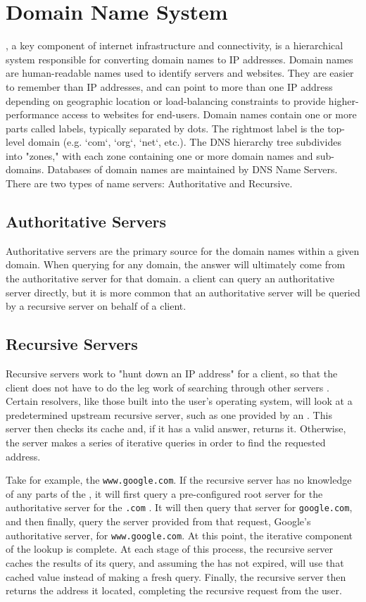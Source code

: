 \section{Domain Name System}\label{sec:background_dns}
\dns, a key component of internet infrastructure and connectivity, is a hierarchical system responsible for converting domain names to IP addresses. Domain names are human-readable names used to identify servers and websites. They are easier to remember than IP addresses, and can point to more than one IP address depending on geographic location or load-balancing constraints to provide higher-performance access to websites for end-users. Domain names contain one or more parts called labels, typically separated by dots. The rightmost label is the top-level domain (e.g. `com`, `org`, `net`, etc.). The DNS hierarchy tree subdivides into "zones," with each zone containing one or more domain names and sub-domains. Databases of domain names are maintained by DNS Name Servers. There are two types of name servers: Authoritative and Recursive.

\subsection{Authoritative Servers}
Authoritative servers are the primary source for the domain names within a given domain. When querying for any domain, the answer will ultimately come from the authoritative server for that domain. a \dns client can query an authoritative server directly, but it is more common that an authoritative server will be queried by a recursive server on behalf of a \dns client.

\subsection{Recursive Servers}
Recursive \dns servers work to "hunt down an IP address" for a client, so that the client does not have to do the leg work of searching through other \dns servers \cite{CloudflareWhatDNS}. Certain \dns resolvers, like those built into the user's operating system, will look at a predetermined upstream recursive \dns server, such as one provided by an \isp \cite{OracleRecursiveWork}. This server then checks its cache and, if it has a valid answer, returns it. Otherwise, the server makes a series of iterative queries in order to find the requested \ip address. 

Take for example, the \acUrl \texttt{www.google.com}. If the recursive server has no knowledge of any parts of the \acUrl, it will first query a pre-configured root \dns server for the authoritative server for the \texttt{.com} \tld. It will then query that server for \texttt{google.com}, and then finally, query the server provided from that request, Google's authoritative \dns server, for \texttt{www.google.com}. At this point, the iterative component of the lookup is complete. At each stage of this process, the recursive server caches the results of its query, and assuming the \ttl has not expired, will use that cached value instead of making a fresh query. Finally, the recursive server then returns the \ip address it located, completing the recursive request from the user.

